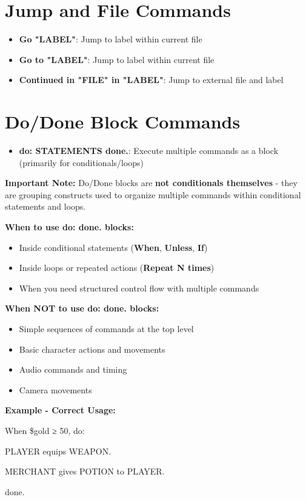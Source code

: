 \documentclass[11pt,letterpaper,oldstylefigures]{memoir}
\newcommand{\stagedir}[1]{#1\par\vspace{1\baselineskip}}
\newenvironment{FountainExample}
  {\begingroup
  \ttfamily\small
   \setlength{\parindent}{0pt}
  \setlength{\parskip}{0.5em}
  \allowdisplaybreaks
  \setlength{\displaywidowpenalty}{0}
  \setlength{\widowpenalty}{0}
  \setlength{\clubpenalty}{0}
  \setlength{\interlinepenalty}{0}
}
  {\endgroup}
\newcommand{\fountain}[1]{\textbf{#1}}
\begin{document}
\section{Jump and File Commands}
\begin{itemize}
\item \fountain{Go "LABEL"}: Jump to label within current file
\item \fountain{Go to "LABEL"}: Jump to label within current file
\item \fountain{Continued in "FILE" in "LABEL"}: Jump to external file and label
\end{itemize}

\section{Do/Done Block Commands}
\begin{itemize}
\item \fountain{do: STATEMENTS done.}: Execute multiple commands as a block (primarily for conditionals/loops)
\end{itemize}

\textbf{Important Note:}
Do/Done blocks are \textbf{not conditionals themselves} - they are grouping constructs used to organize multiple commands within conditional statements and loops.

\textbf{When to use do: done. blocks:}
\begin{itemize}
\item Inside conditional statements (\fountain{When}, \fountain{Unless}, \fountain{If})
\item Inside loops or repeated actions (\fountain{Repeat N times})
\item When you need structured control flow with multiple commands
\end{itemize}

\textbf{When NOT to use do: done. blocks:}
\begin{itemize}
\item Simple sequences of commands at the top level
\item Basic character actions and movements
\item Audio commands and timing
\item Camera movements
\end{itemize}

\textbf{Example - Correct Usage:}
\begin{FountainExample}
\stagedir{When \$gold ≥ 50, do:}
\stagedir{PLAYER equips WEAPON.}
\stagedir{MERCHANT gives POTION to PLAYER.}
\stagedir{done.}
\end{FountainExample}
\end{document}
